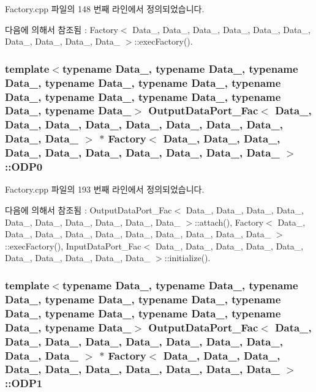 Factory.\+cpp 파일의 148 번째 라인에서 정의되었습니다.



다음에 의해서 참조됨 \+:  Factory$<$ Data\+\_, Data\+\_, Data\+\_, Data\+\_, Data\+\_, Data\+\_, Data\+\_, Data\+\_, Data\+\_, Data\+\_ $>$\+::exec\+Factory().

\subsubsection[{\texorpdfstring{O\+D\+P0}{ODP0}}]{\setlength{\rightskip}{0pt plus 5cm}template$<$typename Data\+\_, typename Data\+\_, typename Data\+\_, typename Data\+\_, typename Data\+\_, typename Data\+\_, typename Data\+\_, typename Data\+\_, typename Data\+\_, typename Data\+\_$>$ {\bf Output\+Data\+Port\+\_\+\+Fac}$<$ Data\+\_, Data\+\_, Data\+\_, Data\+\_, Data\+\_, Data\+\_, Data\+\_, Data\+\_, Data\+\_, Data\+\_ $>$ $\ast$ {\bf Factory}$<$ Data\+\_, Data\+\_, Data\+\_, Data\+\_, Data\+\_, Data\+\_, Data\+\_, Data\+\_, Data\+\_, Data\+\_ $>$\+::O\+D\+P0}\hypertarget{classFactory_a3644b51b1cfbe7385523ab9f08dac1a6}{}\label{classFactory_a3644b51b1cfbe7385523ab9f08dac1a6}


Factory.\+cpp 파일의 193 번째 라인에서 정의되었습니다.



다음에 의해서 참조됨 \+:  Output\+Data\+Port\+\_\+\+Fac$<$ Data\+\_, Data\+\_, Data\+\_, Data\+\_, Data\+\_, Data\+\_, Data\+\_, Data\+\_, Data\+\_, Data\+\_ $>$\+::attach(), Factory$<$ Data\+\_, Data\+\_, Data\+\_, Data\+\_, Data\+\_, Data\+\_, Data\+\_, Data\+\_, Data\+\_, Data\+\_ $>$\+::exec\+Factory(), Input\+Data\+Port\+\_\+\+Fac$<$ Data\+\_, Data\+\_, Data\+\_, Data\+\_, Data\+\_, Data\+\_, Data\+\_, Data\+\_, Data\+\_, Data\+\_ $>$\+::initialize().

\subsubsection[{\texorpdfstring{O\+D\+P1}{ODP1}}]{\setlength{\rightskip}{0pt plus 5cm}template$<$typename Data\+\_, typename Data\+\_, typename Data\+\_, typename Data\+\_, typename Data\+\_, typename Data\+\_, typename Data\+\_, typename Data\+\_, typename Data\+\_, typename Data\+\_$>$ {\bf Output\+Data\+Port\+\_\+\+Fac}$<$ Data\+\_, Data\+\_, Data\+\_, Data\+\_, Data\+\_, Data\+\_, Data\+\_, Data\+\_, Data\+\_, Data\+\_ $>$ $\ast$ {\bf Factory}$<$ Data\+\_, Data\+\_, Data\+\_, Data\+\_, Data\+\_, Data\+\_, Data\+\_, Data\+\_, Data\+\_, Data\+\_ $>$\+::O\+D\+P1}\hypertarget{classFactory_a15fbd1b09238bdd01967b10fd20136d8}{}\label{classFactory_a15fbd1b09238bdd01967b10fd20136d8}


